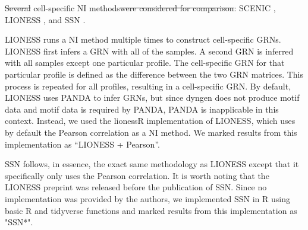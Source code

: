 \documentclass[
  table,
  10pt,
  a4paper]{article}
\providecommand{\DIFaddtex}[1]{{\protect\color{blue}\uwave{#1}}} %
\providecommand{\DIFdeltex}[1]{{\protect\color{red}\sout{#1}}}                      %
\providecommand{\DIFaddbegin}{} %
\providecommand{\DIFaddend}{} %
\providecommand{\DIFdelbegin}{} %
\providecommand{\DIFdelend}{} %
\providecommand{\DIFadd}[1]{\texorpdfstring{\DIFaddtex{#1}}{#1}} %
\providecommand{\DIFdel}[1]{\texorpdfstring{\DIFdeltex{#1}}{}} %
\newcommand{\DIFscaledelfig}{0.5}
\newlength{\DIFdelgraphicswidth} %
\newlength{\DIFdelgraphicsheight} %
\newcommand{\DIFaddincludegraphics}[2][]{{\color{blue}\fbox{\DIFOincludegraphics[#1]{#2}}}} %
\newcommand{\DIFdelincludegraphics}[2][]{%
\sbox{\DIFdelgraphicsbox}{\DIFOincludegraphics[#1]{#2}}%
\settoboxwidth{\DIFdelgraphicswidth}{\DIFdelgraphicsbox} %
\settoboxtotalheight{\DIFdelgraphicsheight}{\DIFdelgraphicsbox} %
\scalebox{\DIFscaledelfig}{%
\parbox[b]{\DIFdelgraphicswidth}{\usebox{\DIFdelgraphicsbox}\\[-\baselineskip] \rule{\DIFdelgraphicswidth}{0em}}\llap{\resizebox{\DIFdelgraphicswidth}{\DIFdelgraphicsheight}{%
\setlength{\unitlength}{\DIFdelgraphicswidth}%
\begin{picture}(1,1)%
\thicklines\linethickness{2pt} %
{\color[rgb]{1,0,0}\put(0,0){\framebox(1,1){}}}%
{\color[rgb]{1,0,0}\put(0,0){\line( 1,1){1}}}%
{\color[rgb]{1,0,0}\put(0,1){\line(1,-1){1}}}%
\end{picture}%
}\hspace*{3pt}}} %
} %
\DeclareRobustCommand{\DIFaddbegin}{\DIFOaddbegin \let\includegraphics\DIFaddincludegraphics} %
\DeclareRobustCommand{\DIFaddend}{\DIFOaddend \let\includegraphics\DIFOincludegraphics} %
\DeclareRobustCommand{\DIFdelbegin}{\DIFOdelbegin \let\includegraphics\DIFdelincludegraphics} %
\DeclareRobustCommand{\DIFdelend}{\DIFOaddend \let\includegraphics\DIFOincludegraphics} %
\begin{document}
\DIFdelbegin \DIFdel{Several }\DIFdelend \DIFaddbegin \DIFadd{We selected three }\DIFaddend cell-specific NI methods\DIFdelbegin \DIFdel{were considered for comparison}\DIFdelend : SCENIC
\autocite{aibar_scenicsinglecellregulatory_2017}, LIONESS
\autocite{kuijjer_estimatingsamplespecificregulatory_2015,kuijjer_estimatingsamplespecificregulatory_2019},
and SSN \autocite{liu_personalizedcharacterizationdiseases_2016}.

LIONESS \autocite{kuijjer_estimatingsamplespecificregulatory_2019} runs
a NI method multiple times to construct cell-specific GRNs. LIONESS
first infers a GRN with all of the samples. A second GRN is inferred
with all samples except one particular profile. The cell-specific GRN
for that particular profile is defined as the difference between the two
GRN matrices. This process is repeated for all profiles, resulting in a
cell-specific GRN. By default, LIONESS uses PANDA
\autocite{glass_passingmessagesbiological_2013} to infer GRNs, but since
dyngen does not produce motif data and motif data is required by PANDA,
PANDA is inapplicable in this context. Instead, we used the lionessR
\autocite{kuijjer_lionessrsinglesample_2019} implementation of LIONESS,
which uses by default the Pearson correlation as a NI method. We marked
results from this implementation as ``LIONESS + Pearson''.

SSN \autocite{liu_personalizedcharacterizationdiseases_2016} follows, in
essence, the exact same methodology as LIONESS except that it
specifically only uses the Pearson correlation. It is worth noting that
the LIONESS preprint was released before the publication of SSN. Since
no implementation was provided by the authors, we implemented SSN in R
using basic R and tidyverse functions
\autocite{wickham_welcometidyverse_2019} and marked results from this
implementation as "SSN*".
\end{document}
